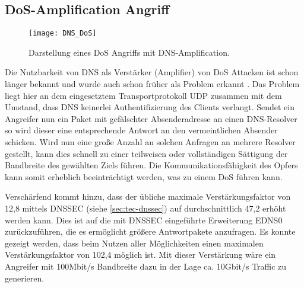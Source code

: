 \subsection{DoS-Amplification Angriff}
\label{sec:attack-dosamp}
\begin{wrapfigure}{r}{0.35\textwidth}
    \begin{center}
        \texttt{[image: DNS\_DoS]}
    \end{center}
    \caption{Darstellung eines DoS Angriffs mit DNS-Amplification.}
    \label{img:dnsdos}
\end{wrapfigure}

Die Nutzbarkeit von DNS als Verstärker (Amplifier) von \ac{DoS} Attacken ist schon länger bekannt und wurde auch schon früher als Problem erkannt \cite{ICANN2006}. Das Problem liegt hier an dem eingesetztem Transportprotokoll UDP zusammen mit dem Umstand, dass DNS keinerlei Authentifizierung des Clients verlangt. Sendet ein Angreifer nun ein Paket mit gefälschter Absenderadresse an einen DNS-Resolver so wird dieser eine entsprechende Antwort an den vermeintlichen Absender schicken. Wird nun eine große Anzahl an solchen Anfragen an mehrere Resolver gestellt, kann dies schnell zu einer teilweisen oder vollständigen Sättigung der Bandbreite des gewählten Ziels führen. Die Kommunikationsfähigkeit des Opfers kann somit erheblich beeinträchtigt werden, was zu einem \ac{DoS} führen kann. 

Verschärfend kommt hinzu, dass der übliche maximale Verstärkungsfaktor von 12,8 mittels \ac{DNSSEC} (siehe \ref{sec:tec-dnssec}) auf durchschnittlich 47,2 erhöht werden kann. Dies ist auf die mit \ac{DNSSEC} eingeführte Erweiterung EDNS0 zurückzuführen, die es ermöglicht größere Antwortpakete anzufragen. Es konnte gezeigt werden, dass beim Nutzen aller Möglichkeiten einen maximalen Verstärkungsfaktor von 102,4 möglich ist\cite{VanRijswijk-Deij2014}. Mit dieser Verstärkung wäre ein Angreifer mit 100Mbit/s Bandbreite dazu in der Lage ca. 10Gbit/s Traffic zu generieren.

